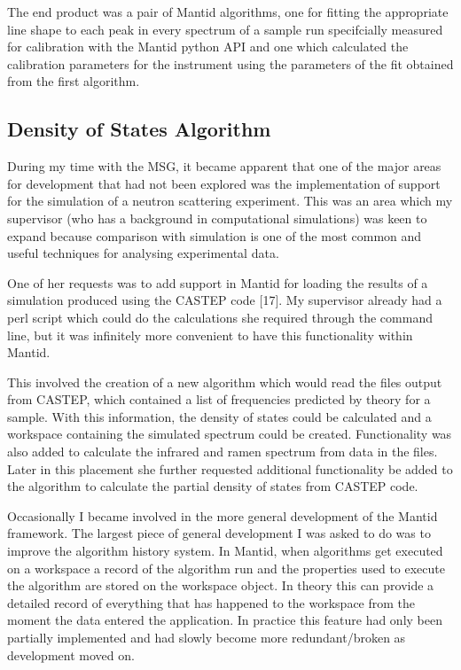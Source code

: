 \documentclass[paper=a4, fontsize=11pt]{scrartcl}	%
\numberwithin{equation}{section}															%
\numberwithin{figure}{section}																%
\numberwithin{table}{section}
\begin{document}
The end product was a pair of Mantid algorithms, one for fitting the
appropriate line shape to each peak in every spectrum of a sample run
specifcially measured for calibration with the Mantid python API and one
which calculated the calibration parameters for the instrument using the
parameters of the fit obtained from the first algorithm.

\subsection{Density of States
Algorithm}\label{density-of-states-algorithm}

During my time with the MSG, it became apparent that one of the major
areas for development that had not been explored was the implementation
of support for the simulation of a neutron scattering experiment. This
was an area which my supervisor (who has a background in computational
simulations) was keen to expand because comparison with simulation is
one of the most common and useful techniques for analysing experimental
data.

One of her requests was to add support in Mantid for loading the results
of a simulation produced using the CASTEP code {[}17{]}. My supervisor
already had a perl script which could do the calculations she required
through the command line, but it was infinitely more convenient to have
this functionality within Mantid.

This involved the creation of a new algorithm which would read the files
output from CASTEP, which contained a list of frequencies predicted by
theory for a sample. With this information, the density of states could
be calculated and a workspace containing the simulated spectrum could be
created. Functionality was also added to calculate the infrared and
ramen spectrum from data in the files. Later in this placement she
further requested additional functionality be added to the algorithm to
calculate the partial density of states from CASTEP code.


Occasionally I became involved in the more general development of the
Mantid framework. The largest piece of general development I was asked
to do was to improve the algorithm history system. In Mantid, when
algorithms get executed on a workspace a record of the algorithm run and
the properties used to execute the algorithm are stored on the workspace
object. In theory this can provide a detailed record of everything that
has happened to the workspace from the moment the data entered the
application. In practice this feature had only been partially
implemented and had slowly become more redundant/broken as development
moved on.
\end{document}
